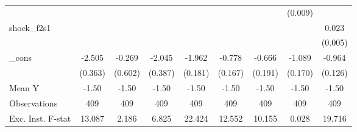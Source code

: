 {\begin{tabular}{l*{8}{c}}
            &                     &                     &                     &                     &                     &                     &     (0.009)         &                     \\
\addlinespace
shock\_f2s1  &                     &                     &                     &                     &                     &                     &                     &       0.023\sym{***}\\
            &                     &                     &                     &                     &                     &                     &                     &     (0.005)         \\
\addlinespace
\_cons      &      -2.505\sym{***}&      -0.269         &      -2.045\sym{***}&      -1.962\sym{***}&      -0.778\sym{***}&      -0.666\sym{***}&      -1.089\sym{***}&      -0.964\sym{***}\\
            &     (0.363)         &     (0.602)         &     (0.387)         &     (0.181)         &     (0.167)         &     (0.191)         &     (0.170)         &     (0.126)         \\
\midrule
Mean Y      &       -1.50         &       -1.50         &       -1.50         &       -1.50         &       -1.50         &       -1.50         &       -1.50         &       -1.50         \\
Observations&         409         &         409         &         409         &         409         &         409         &         409         &         409         &         409         \\
Exc. Inst. F-stat&      13.087         &       2.186         &       6.825         &      22.424         &      12.552         &      10.155         &       0.028         &      19.716         \\
\bottomrule
\end{tabular}
}
